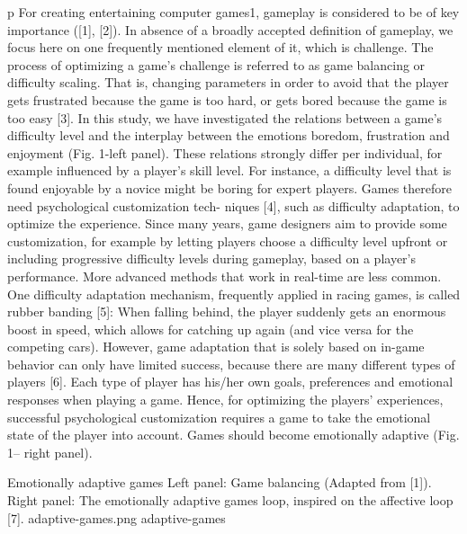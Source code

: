 p For creating entertaining computer games1, gameplay is considered to be of key importance ([1], [2]). In absence of a broadly accepted definition of gameplay, we focus here on one frequently mentioned element of it, which is challenge. The process of optimizing a game’s challenge is referred to as game balancing or difficulty scaling. That is, changing parameters in order to avoid that the player gets frustrated because the game is too hard, or gets bored because the game is too easy [3]. In this study, we have investigated the relations between a game's difficulty level and the interplay between the emotions boredom, frustration and enjoyment (Fig. 1-left panel). These 
relations strongly differ per individual, for example influenced by a player's skill level. For instance, a difficulty level that is found enjoyable by a novice might be boring for expert players. Games therefore need psychological customization tech- niques [4], such as difficulty adaptation, to optimize the experience. Since many years, game designers aim to provide some customization, for example by letting players choose a difficulty level upfront or including progressive difficulty levels during gameplay, based on a player’s performance.   More advanced methods that work in real-time are less common. One difficulty adaptation mechanism, frequently applied in racing games, is called rubber banding [5]: When falling behind, the player suddenly gets an enormous boost in speed, which allows for catching up again (and vice versa for the competing cars). However, game adaptation that is solely based on in-game behavior can only have limited success, because there are many different types of players [6]. Each type of player has his/her own goals, preferences and emotional responses when playing a game. Hence, for optimizing the players' experiences, successful psychological customization requires a game to take the emotional state of the player into account. Games should become emotionally adaptive (Fig. 1– right panel). 

\img
{Emotionally adaptive games}
{Left panel: Game balancing (Adapted from [1]). Right panel: The emotionally adaptive games loop, inspired on the affective loop [7]. }
{adaptive-games.png}
{adaptive-games}

